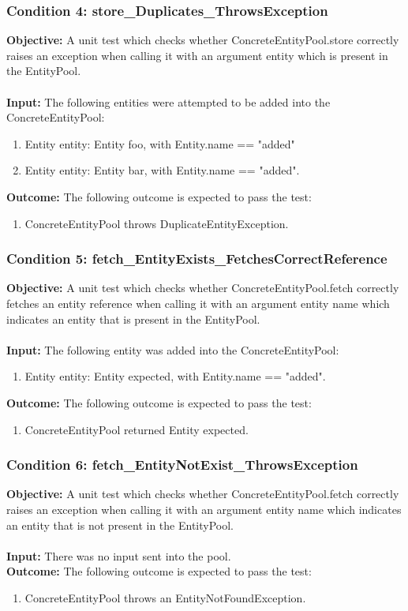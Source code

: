 \documentclass[a4paper,12pt]{article}
\begin{document}
		\subsubsection{Condition 4: store\_Duplicates\_ThrowsException}
			\textbf{Objective:} A unit test which checks whether ConcreteEntityPool.store correctly raises an exception when calling it with an argument entity which is present in the EntityPool.\\\\
			\textbf{Input:} The following entities were attempted to be added into the ConcreteEntityPool:
				\begin{enumerate}
					\item Entity entity: Entity foo, with Entity.name == "added"
					\item Entity entity: Entity bar, with Entity.name == "added".\\
				\end{enumerate}
			\textbf{Outcome:} The following outcome is expected to pass the test:
				\begin{enumerate}
					\item ConcreteEntityPool throws DuplicateEntityException.
				\end{enumerate}
		\subsubsection{Condition 5: fetch\_EntityExists\_FetchesCorrectReference}
			\textbf{Objective:} A unit test which checks whether ConcreteEntityPool.fetch correctly fetches an entity reference when calling it with an argument entity name which indicates an entity that is present in the EntityPool.\\\\
			\textbf{Input:} The following entity was added into the ConcreteEntityPool:
				\begin{enumerate}
					\item Entity entity: Entity expected, with Entity.name == "added".\\
				\end{enumerate}
			\textbf{Outcome:} The following outcome is expected to pass the test:
				\begin{enumerate}
					\item ConcreteEntityPool returned Entity expected.
				\end{enumerate}
		\subsubsection{Condition 6: fetch\_EntityNotExist\_ThrowsException}
			\textbf{Objective:} A unit test which checks whether ConcreteEntityPool.fetch correctly raises an exception when calling it with an argument entity name which indicates an entity that is not present in the EntityPool.\\\\
			\textbf{Input:} There was no input sent into the pool.\\
			\textbf{Outcome:} The following outcome is expected to pass the test:
				\begin{enumerate}
					\item ConcreteEntityPool throws an EntityNotFoundException.
				\end{enumerate}
\end{document}

